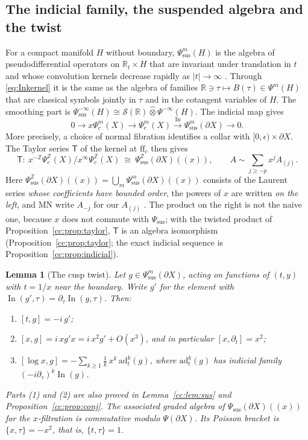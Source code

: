 \documentclass[11pt,oneside,reqno]{article}
\DeclareMathOperator{\In}{In}
\newcommand{\R}{\mathbb R}
\newcommand{\Z}{\mathbb Z}
\newcommand{\cS}{\mathcal S}
\newcommand{\Psic}{\Psi_{c}}
\newcommand{\Psis}{\Psi_{\mathrm{sus}}}
\newcommand{\lx}{\log x}
\theoremstyle{plain}
\newtheorem{lemma}[theorem]{Lemma}
\theoremstyle{definition}
\theoremstyle{remark}
\newcommand{\Lser}[1]{(\!(#1)\!)}
\begin{document}
\subsection{The indicial family, the suspended algebra and the twist}
\label{subsec:twist}
For a compact manifold \(H\) without boundary, \(\Psis^m(H)\) is the
algebra of pseudodifferential operators on \(\R_t\times H\) that are
invariant under translation in \(t\) and whose convolution kernels decrease
rapidly as \(|t|\to\infty\) \cite{MelroseEta}. Through \eqref{eq:Inkernel}
it is the same as the algebra of families \(\R\ni\tau\mapsto B(\tau)\in
\Psi^m(H)\) that are classical symbols jointly in \(\tau\) and in the
cotangent variables of \(H\). The smoothing part is
\(\Psis^{-\infty}(H)\cong\cS(\R)\widehat\otimes\Psi^{-\infty}(H)\). The
indicial map gives \cite[(12)]{MN}
\[
 0\to x\Psic^m(X)\to\Psic^m(X)\xrightarrow{\In}\Psis^m(\partial X)\to0 .
\]
More precisely, a choice of normal fibration identifies a collar with
\([0,\epsilon)\times\partial X\). The Taylor series \(\mathsf T\) of the
kernel at \(\mathrm{ff}_c\) then gives \cite[Prop.~25]{MN}
\begin{equation}\label{eq:taylor}
 \mathsf T:\ x^{-\Z}\Psic^{\Z}(X)/x^\infty\Psic^{\Z}(X)\ \cong\ \Psis^{\Z}(\partial X)\Lser{x},
 \qquad A\sim\sum_{j\ge-p}x^jA_{(j)} .
\end{equation}
Here \(\Psis^{\Z}(\partial X)\Lser{x}=\bigcup_m\Psis^m(\partial X)\Lser{x}\)
consists of the Laurent series \emph{whose coefficients have bounded
order}, the powers of \(x\) are written \emph{on the left}, and MN write
\(A_{-j}\) for our \(A_{(j)}\) \cite[(53)]{MN}. The product on the right
is not the naive one, because \(x\) does not commute with \(\Psis\); with
the twisted product of Proposition~\ref{cc:prop:taylor}, \(\mathsf T\) is
an algebra isomorphism (Proposition~\ref{cc:prop:taylor}; the exact
indicial sequence is Proposition~\ref{cc:prop:indicial}).

\begin{lemma}[The cusp twist]\label{lem:twist}
Let \(g\in\Psis^m(\partial X)\), acting on functions of \((t,y)\) with
\(t=1/x\) near the boundary. Write \(g'\) for the element with
\(\In(g',\tau)=\partial_\tau\In(g,\tau)\). Then:
\begin{enumerate}
\item \([t,g]=-i\,g'\);
\item \([x,g]=i\,xg'x=i\,x^2g'+O(x^3)\), and in particular
\([x,\partial_t]=x^2\);
\item \([\lx,g]=-\sum_{k\ge1}\frac1k\,x^k\,\mathrm{ad}_t^k(g)\), where
\(\mathrm{ad}_t^k(g)\) has indicial family \((-i\partial_\tau)^k\In(g)\).
\end{enumerate}
Parts (1) and (2) are also proved in Lemma~\ref{cc:lem:sus} and
Proposition~\ref{cc:prop:conj}.
The associated graded algebra of \(\Psis(\partial X)\Lser{x}\) for the
\(x\)-filtration is commutative modulo \(\Psi(\partial X)\). Its Poisson
bracket is \(\{x,\tau\}=-x^2\), that is, \(\{t,\tau\}=1\).
\end{lemma}
\end{document}
